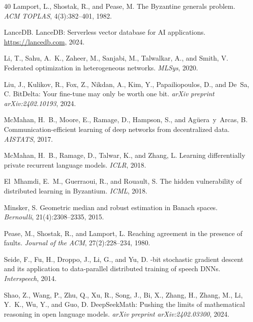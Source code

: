 \documentclass[11pt]{article}
\begin{document}
\begin{thebibliography}{40}
Lamport, L., Shostak, R., and Pease, M.
\newblock The Byzantine generals problem.
\newblock \emph{ACM TOPLAS}, 4(3):382--401, 1982.

LanceDB.
\newblock LanceDB: Serverless vector database for AI applications.
\newblock \url{https://lancedb.com}, 2024.

Li, T., Sahu, A.~K., Zaheer, M., Sanjabi, M., Talwalkar, A., and
  Smith, V.
\newblock Federated optimization in heterogeneous networks.
\newblock \emph{MLSys}, 2020.

Liu, J., Kulikov, R., Fox, Z., Nikdan, A., Kim, Y., Papailiopoulos, D.,
  and De~Sa, C.
\newblock BitDelta: Your fine-tune may only be worth one bit.
\newblock \emph{arXiv preprint arXiv:2402.10193}, 2024.

McMahan, H.~B., Moore, E., Ramage, D., Hampson, S., and
  Ag{\"u}era~y~Arcas, B.
\newblock Communication-efficient learning of deep networks from decentralized
  data.
\newblock \emph{AISTATS}, 2017.

McMahan, H.~B., Ramage, D., Talwar, K., and Zhang, L.
\newblock Learning differentially private recurrent language models.
\newblock \emph{ICLR}, 2018.

El~Mhamdi, E.~M., Guerraoui, R., and Rouault, S.
\newblock The hidden vulnerability of distributed learning in Byzantium.
\newblock \emph{ICML}, 2018.

Minsker, S.
\newblock Geometric median and robust estimation in Banach spaces.
\newblock \emph{Bernoulli}, 21(4):2308--2335, 2015.

Pease, M., Shostak, R., and Lamport, L.
\newblock Reaching agreement in the presence of faults.
\newblock \emph{Journal of the ACM}, 27(2):228--234, 1980.

Seide, F., Fu, H., Droppo, J., Li, G., and Yu, D.
-bit stochastic gradient descent and its application to
  data-parallel distributed training of speech DNNs.
\newblock \emph{Interspeech}, 2014.

Shao, Z., Wang, P., Zhu, Q., Xu, R., Song, J., Bi, X., Zhang, H., Zhang, M.,
  Li, Y.~K., Wu, Y., and Guo, D.
\newblock DeepSeekMath: Pushing the limits of mathematical reasoning in open
  language models.
\newblock \emph{arXiv preprint arXiv:2402.03300}, 2024.


\end{thebibliography}
\end{document}
